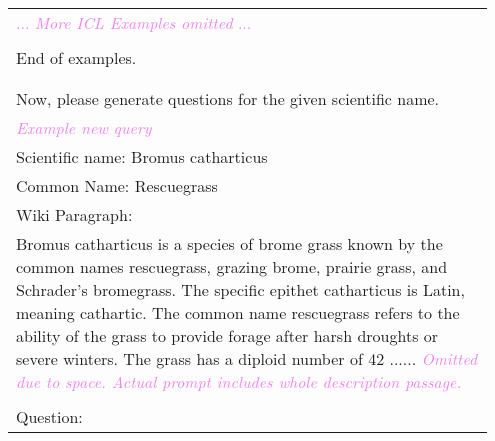 \begin{longtable}{p{0.95\linewidth}}
\\
\textcolor{violet}{... \textit{More ICL Examples omitted} ...}
\\\\

End of examples.
\\\\\\Now, please generate questions for the given scientific name.\\
\textcolor{violet}{\textit{Example new query}}\\
Scientific name: Bromus catharticus\\Common Name: Rescuegrass\\Wiki Paragraph:\\Bromus catharticus is a species of brome grass known by the common names rescuegrass, grazing brome, prairie grass, and Schrader's bromegrass. The specific epithet catharticus is Latin, meaning cathartic. The common name rescuegrass refers to the ability of the grass to provide forage after harsh droughts or severe winters. The grass has a diploid number of 42 ...... \textcolor{violet}{\textit{Omitted due to space. Actual prompt includes whole description passage.}}\\ \\Question:\\

\end{longtable}
